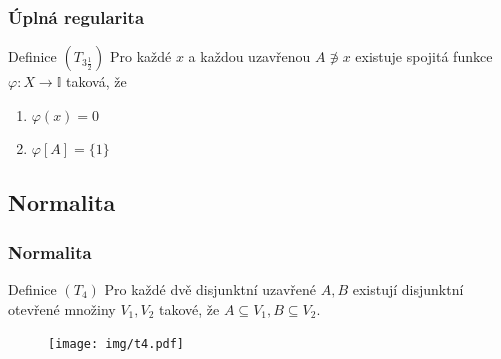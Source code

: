 \documentclass[mathserif]{beamer}
\begin{document}

\begin{frame}
\frametitle{Úplná regularita}

\newcommand{\I}{\mathbb{I}}
\renewcommand{\phi}{\varphi}
\begin{block}{Definice $(T_{3\frac{1}{2}})$}
  Pro každé $x$ a každou uzavřenou $A \not\owns x$ existuje spojitá funkce 
  $\phi\colon X \to \I$ taková, že
  \begin{enumerate}
    \item $\phi(x) = 0$
    \item $\phi[A] = \{1\}$
  \end{enumerate}
\end{block}

\end{frame}


\subsection{Normalita}

\begin{frame}
\frametitle{Normalita}
\begin{block}{Definice $(T_4)$}
  Pro každé dvě disjunktní uzavřené $A, B$ existují disjunktní otevřené množiny
  $V_1, V_2$ takové, že $A \subseteq V_1, B \subseteq V_2$.
\end{block}

\begin{figure}
  \texttt{[image: img/t4.pdf]}
\end{figure}

\end{frame}


%
%
%
\end{document}
